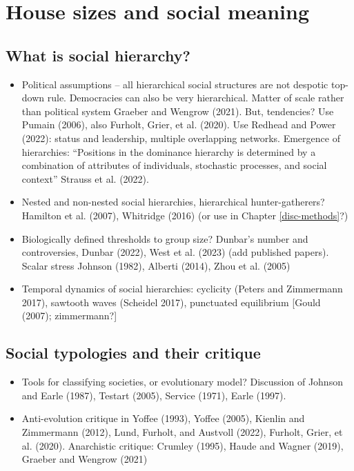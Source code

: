\documentclass[
  12pt,
]{book}
\begin{document}
\hypertarget{house-sizes-theory}{%
\chapter{House sizes and social meaning}\label{house-sizes-theory}}

\hypertarget{what-is-social-hierarchy}{%
\section{What is social hierarchy?}\label{what-is-social-hierarchy}}

\begin{itemize}
\item
  Political assumptions -- all hierarchical social structures are not despotic top-down rule. Democracies can also be very hierarchical. Matter of scale rather than political system Graeber and Wengrow (2021). But, tendencies? Use Pumain (2006), also Furholt, Grier, et al. (2020). Use Redhead and Power (2022): status and leadership, multiple overlapping networks. Emergence of hierarchies: ``Positions in the dominance hierarchy is determined by a combination of attributes of individuals, stochastic processes, and social context'' Strauss et al. (2022).
\item
  Nested and non-nested social hierarchies, hierarchical hunter-gatherers? Hamilton et al. (2007), Whitridge (2016) (or use in Chapter \ref{disc-methods}?)
\item
  Biologically defined thresholds to group size? Dunbar's number and controversies, Dunbar (2022), West et al. (2023) (add published papers). Scalar stress Johnson (1982), Alberti (2014), Zhou et al. (2005)
\item
  Temporal dynamics of social hierarchies: cyclicity (Peters and Zimmermann 2017), sawtooth waves (Scheidel 2017), punctuated equilibrium {[}Gould (2007); zimmermann?{]}
\end{itemize}

\hypertarget{soc-typ}{%
\section{Social typologies and their critique}\label{soc-typ}}

\begin{itemize}
\item
  Tools for classifying societies, or evolutionary model? Discussion of Johnson and Earle (1987), Testart (2005), Service (1971), Earle (1997).
\item
  Anti-evolution critique in Yoffee (1993), Yoffee (2005), Kienlin and Zimmermann (2012), Lund, Furholt, and Austvoll (2022), Furholt, Grier, et al. (2020). Anarchistic critique: Crumley (1995), Haude and Wagner (2019), Graeber and Wengrow (2021)
\end{itemize}
\end{document}
